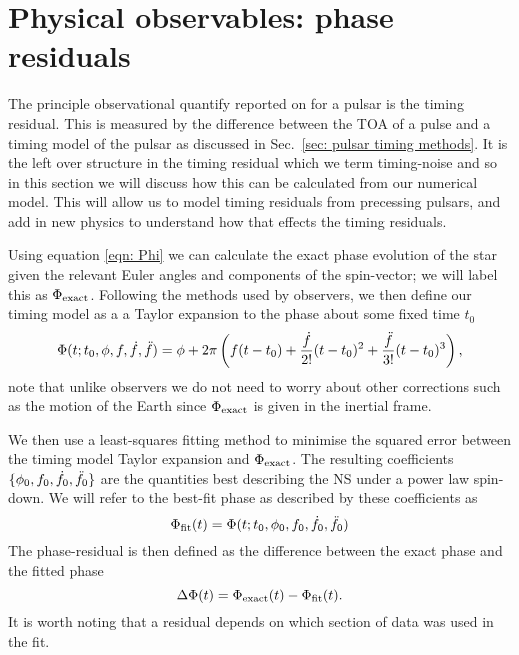 \documentclass[../full_thesis/full_thesis.tex]{subfiles}
\begin{document}
\section{Physical observables: phase residuals}
\label{sec: timing residuals}

The principle observational quantify reported on for a pulsar is the timing
residual. This is measured by the difference between the TOA of a pulse and a
timing model of the pulsar as discussed in Sec.~\ref{sec: pulsar timing
methods}. It is the left over structure in the timing residual which we
term timing-noise and so in this section we will discuss how this can be calculated
from our numerical model. This will allow us to model timing residuals from
precessing pulsars, and add in new physics to understand how that effects the
timing residuals.

Using equation \eqref{eqn: Phi} we can calculate the exact phase evolution of
the star given the relevant Euler angles and components of the spin-vector; we
will label this as $\Phi_{\mathrm{exact}}$. Following the methods used by observers, we
then define our timing model as a
a Taylor expansion to the phase about some fixed time $t_{0}$
\begin{equation}
    \Phi(t; t_{0}, \phi, f, \dot{f}, \ddot{f}) =
    \phi + 2\pi \left(f(t - t_{0}) +
                          \frac{\dot{f}}{2!}(t-t_{0})^{2} +
                          \frac{\ddot{f}}{3!}(t-t_{0})^{3}
                          \right),
\label{eqn: TR taylor expansion}
\end{equation}
note that unlike observers we do not need to worry about other corrections such
as the motion of the Earth since $\Phi_{\mathrm{exact}}$ is given in the inertial frame.

We then use a least-squares fitting method to minimise the squared error
between the timing model Taylor expansion and $\Phi_{\mathrm{exact}}$. The resulting
coefficients $\{\phi_{0}, f_{0}, \dot{f}_{0}, \ddot{f}_{0}\}$ are the quantities
best describing the NS under a power law spin-down. We will refer to the
best-fit phase as described by  these coefficients as
\begin{equation}
    \Phi_{\mathrm{fit}}(t) = \Phi(t; t_{0}, \phi_{0}, f_{0}, \dot{f}_{0}, \ddot{f}_{0})
\end{equation}
The phase-residual is then defined as the difference between the exact phase
and the fitted phase
\begin{equation}
  \Delta\Phi(t) = \Phi_{\mathrm{exact}}(t) - \Phi_{\mathrm{fit}}(t).
\end{equation}
It is worth noting that a residual depends on which section of data was
used in the fit.
\end{document}

